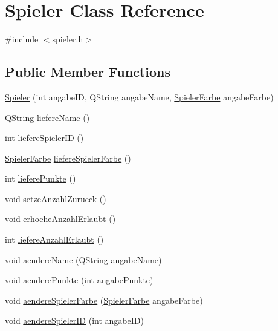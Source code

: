\hypertarget{classSpieler}{\section{Spieler Class Reference}
\label{classSpieler}
}


{\ttfamily \#include $<$spieler.\-h$>$}

\subsection*{Public Member Functions}
\begin{DoxyCompactItemize}
\item 
\hyperlink{classSpieler_aa7e36bd9766673980d37fc93514b709c}{Spieler} (int angabe\-I\-D, Q\-String angabe\-Name, \hyperlink{DEFINE_8h_af7777a498318335ea89b85bdc0d1651f}{Spieler\-Farbe} angabe\-Farbe)
\item 
Q\-String \hyperlink{classSpieler_ab98f6cd34355abdbacfe90fd4f29c828}{liefere\-Name} ()
\item 
int \hyperlink{classSpieler_a57b383a331cb0c483a98a0bd39d489fc}{liefere\-Spieler\-I\-D} ()
\item 
\hyperlink{DEFINE_8h_af7777a498318335ea89b85bdc0d1651f}{Spieler\-Farbe} \hyperlink{classSpieler_a215f804783a3ebb96a1ceda8ffb1fc32}{liefere\-Spieler\-Farbe} ()
\item 
int \hyperlink{classSpieler_a8f7175f91c3b27f2da17b6c2056fd78f}{liefere\-Punkte} ()
\item 
void \hyperlink{classSpieler_affffa216287f59762c812be82d291945}{setze\-Anzahl\-Zurueck} ()
\item 
void \hyperlink{classSpieler_a572ac9e1dc7ced68f7093d2a804c1795}{erhoehe\-Anzahl\-Erlaubt} ()
\item 
int \hyperlink{classSpieler_a4d911d9721c64bca5f50ef0424863517}{liefere\-Anzahl\-Erlaubt} ()
\item 
void \hyperlink{classSpieler_a7208f0e7168efad1dda334ef7f394092}{aendere\-Name} (Q\-String angabe\-Name)
\item 
void \hyperlink{classSpieler_a8429133e40c2cc08592748e96795b3b6}{aendere\-Punkte} (int angabe\-Punkte)
\item 
void \hyperlink{classSpieler_ad98ec95472e5dc130b5c436c98469171}{aendere\-Spieler\-Farbe} (\hyperlink{DEFINE_8h_af7777a498318335ea89b85bdc0d1651f}{Spieler\-Farbe} angabe\-Farbe)
\item 
void \hyperlink{classSpieler_a5e56b6bf328dd8bbc9df0305add0e5e6}{aendere\-Spieler\-I\-D} (int angabe\-I\-D)
\end{DoxyCompactItemize}


